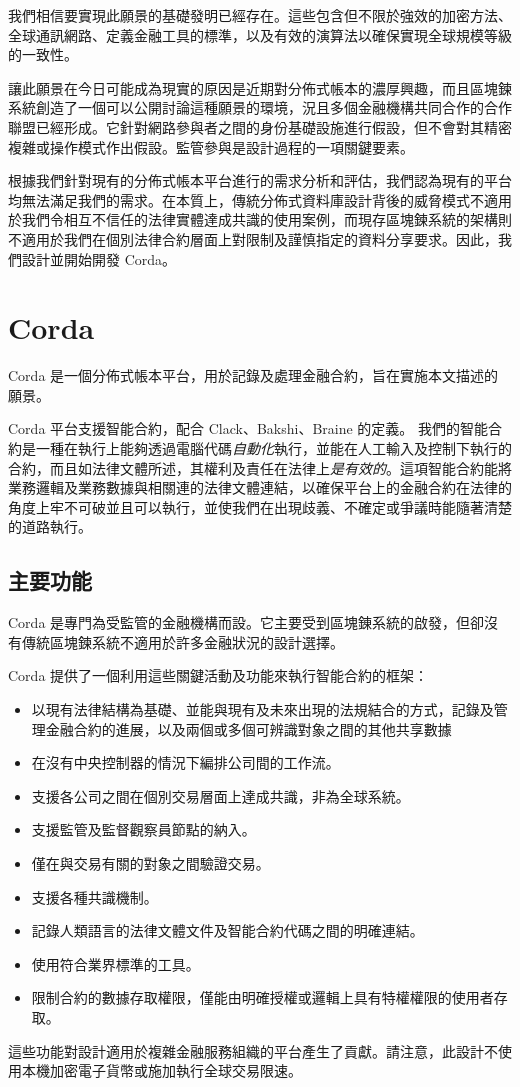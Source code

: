 ﻿\documentclass{article}
\begin{document}
我們相信要實現此願景的基礎發明已經存在。這些包含但不限於強效的加密方法、全球通訊網路、定義金融工具的標準，以及有效的演算法以確保實現全球規模等級的一致性。 

讓此願景在今日可能成為現實的原因是近期對分佈式帳本的濃厚興趣，而且區塊鍊系統創造了一個可以公開討論這種願景的環境，況且多個金融機構共同合作的合作聯盟已經形成。它針對網路參與者之間的身份基礎設施進行假設，但不會對其精密複雜或操作模式作出假設。監管參與是設計過程的一項關鍵要素。

根據我們針對現有的分佈式帳本平台進行的需求分析和評估，我們認為現有的平台均無法滿足我們的需求。在本質上，傳統分佈式資料庫設計背後的威脅模式不適用於我們令相互不信任的法律實體達成共識的使用案例，而現存區塊鍊系統的架構則不適用於我們在個別法律合約層面上對限制及謹慎指定的資料分享要求。因此，我們設計並開始開發 Corda。

\section{Corda}
Corda 是一個分佈式帳本平台，用於記錄及處理金融合約，旨在實施本文描述的願景。  

Corda 平台支援智能合約，配合 Clack、Bakshi、Braine 的定義。\cite{SCT} 我們的智能合約是一種在執行上能夠透過電腦代碼\textit{自動化}執行，並能在人工輸入及控制下執行的合約，而且如法律文體所述，其權利及責任在法律上\textit{是有效的}。這項智能合約能將業務邏輯及業務數據與相關連的法律文體連結，以確保平台上的金融合約在法律的角度上牢不可破並且可以執行，並使我們在出現歧義、不確定或爭議時能隨著清楚的道路執行。

\subsection{主要功能}
Corda 是專門為受監管的金融機構而設。它主要受到區塊錬系統的啟發，但卻沒有傳統區塊鍊系統不適用於許多金融狀況的設計選擇。 

Corda 提供了一個利用這些關鍵活動及功能來執行智能合約的框架：
\begin{itemize}
    \item{以現有法律結構為基礎、並能與現有及未來出現的法規結合的方式，記錄及管理金融合約的進展，以及兩個或多個可辨識對象之間的其他共享數據}
    \item{在沒有中央控制器的情況下編排公司間的工作流。}
    \item{支援各公司之間在個別交易層面上達成共識，非為全球系統。}
    \item{支援監管及監督觀察員節點的納入。}
    \item{僅在與交易有關的對象之間驗證交易。}
    \item{支援各種共識機制。}
    \item{記錄人類語言的法律文體文件及智能合約代碼之間的明確連結。}
    \item{使用符合業界標準的工具。}
    \item{限制合約的數據存取權限，僅能由明確授權或邏輯上具有特權權限的使用者存取。}
\end{itemize}
這些功能對設計適用於複雜金融服務組織的平台產生了貢獻。請注意，此設計不使用本機加密電子貨幣或施加執行全球交易限速。
\end{document}
